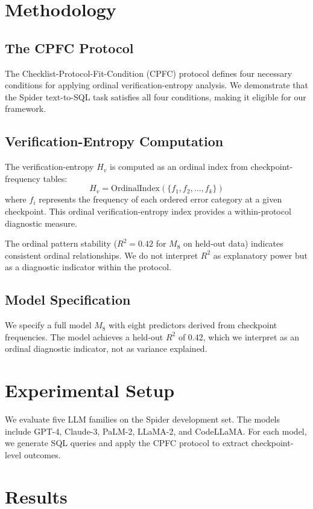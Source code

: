\documentclass[11pt]{article}
\begin{document}
\section{Methodology}
\subsection{The CPFC Protocol}
The Checklist-Protocol-Fit-Condition (CPFC) protocol defines four necessary conditions for applying ordinal verification-entropy analysis. We demonstrate that the Spider text-to-SQL task satisfies all four conditions, making it eligible for our framework.

\subsection{Verification-Entropy Computation}
The verification-entropy $H_v$ is computed as an ordinal index from checkpoint-frequency tables:
\begin{equation}
H_v = \text{OrdinalIndex}(\{f_1, f_2, ..., f_k\})
\end{equation}
where $f_i$ represents the frequency of each ordered error category at a given checkpoint. This ordinal verification-entropy index provides a within-protocol diagnostic measure.

The ordinal pattern stability ($R^2 = 0.42$ for $M_8$ on held-out data) indicates consistent ordinal relationships. We do not interpret $R^2$ as explanatory power but as a diagnostic indicator within the protocol.

\subsection{Model Specification}
We specify a full model $M_8$ with eight predictors derived from checkpoint frequencies. The model achieves a held-out $R^2$ of 0.42, which we interpret as an ordinal diagnostic indicator, not as variance explained.

\section{Experimental Setup}
We evaluate five LLM families on the Spider development set. The models include GPT-4, Claude-3, PaLM-2, LLaMA-2, and CodeLLaMA. For each model, we generate SQL queries and apply the CPFC protocol to extract checkpoint-level outcomes.

\section{Results}
\end{document}
